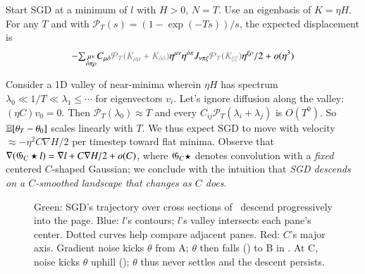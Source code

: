 %
\begin{cor}\label{cor:entropic}%
    Start SGD at a minimum of $l$ with $H>0$, $N=T$.  Use
    an eigenbasis of $K=\eta H$.  
    For any $T$ and
    with ${\mathcal P}_T(s) = (1 - \exp(-Ts))/s$,
    the 
    expected displacement is
    $$
        -
        {\textstyle\sum_{\substack{\mu\nu    \\ \omicron\pi\rho}}}
            C_{\mu\omicron}
            {\color{gray}{\mathcal P}_T(K_{\mu\mu} + K_{\omicron\omicron})}
            \eta^{\mu\nu}\eta^{\omicron\pi}
            J_{\nu\pi\xi}
            {\color{gray}{\mathcal P}_T(K_{\xi\xi})}\eta^{\xi\rho}/2
        + o(\eta^3)
        \squish\squish
    $$
\end{cor}

Consider a 1D valley of near-minima wherein $\eta H$ has spectrum
$\lambda_0 \ll 1/T \ll \lambda_1 \leq \cdots$ for eigenvectors
$v_i$.  Let's ignore diffusion along the valley: $(\eta C) v_0 =
0$.
%
Then ${\mathcal P}_T(\lambda_0)\approx T$ and every
$C_{ij}{\mathcal P}_T(\lambda_i+\lambda_j)$ is $O(T^0)$.  So $\mathbb{E}[\theta_T-\theta_0]$
scales linearly with $T$.  We thus expect SGD to move with
velocity $\approx -\eta^2 C\nabla H/2$ per timestep toward flat minima.  
Observe that $\nabla ({\frak G}_C \star l) = \nabla l+C\nabla
H/2 + o(C)$, where ${\frak G}_C \star$ denotes convolution with a
\emph{fixed} centered $C$-shaped Gaussian; we conclude with the
intuition that \emph{SGD descends on a $C$-smoothed landscape that
changes as $C$ does}.  %

\begin{figure}[h!]
    \squash
    \caption{%
        Green: SGD's trajectory over 
        cross sections of \Helix\ descend progressively
        into the page.  Blue: $l$'s contours; $l$'s valley
        intersects each pane's center.  Dotted
        curves help compare adjacent panes.
        Red: %
        $C$'s
        major axis.
        Gradient noise kicks $\theta$ from A; $\theta$ then falls
        (\hspace{-0.12cm}\protect{}) to B in {\hspace{-0.08cm}\protect{}}.  At C,
        noise kicks $\theta$ uphill (\hspace{-0.08cm}\protect{}); $\theta$
        thus never settles and the descent persists.
    }
    \squash\squash
    \label{fig:archimedes}
\end{figure}

